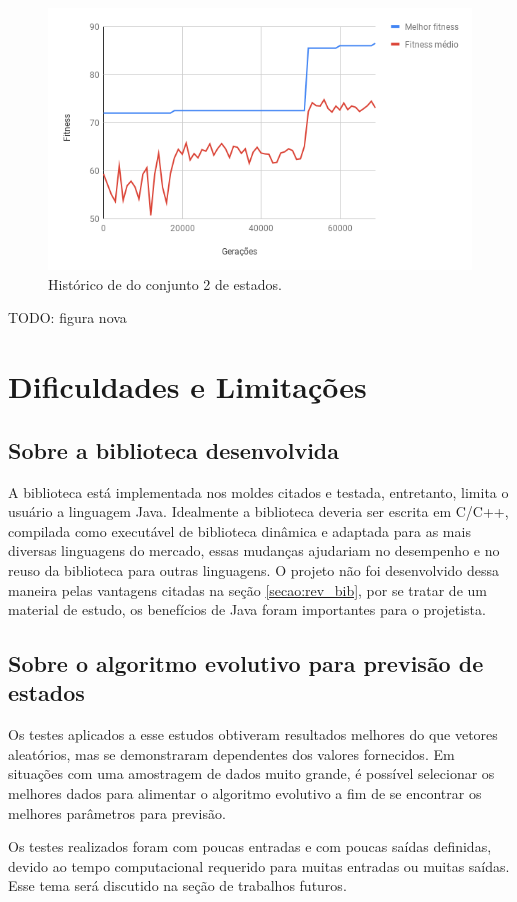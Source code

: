 \begin{figure}[htb]
    \caption{Histórico de \fitness do conjunto 2 de estados.}
    \label{figura:resultado_79}
    \centering
    \includegraphics[scale=0.8]{images/resultado_79}
    \fautor
\end{figure}

TODO: figura nova

\section{Dificuldades e Limitações}

\subsection{Sobre a biblioteca desenvolvida}

A biblioteca está implementada nos moldes citados e testada, entretanto, limita o usuário a linguagem Java. Idealmente a biblioteca deveria ser escrita em C/C++, compilada como executável de biblioteca dinâmica e adaptada para as mais diversas linguagens do mercado, essas mudanças ajudariam no desempenho e no reuso da biblioteca para outras linguagens. O projeto não foi desenvolvido dessa maneira pelas vantagens citadas na seção \ref{secao:rev_bib}, por se tratar de um material de estudo, os benefícios de Java foram importantes para o projetista.

\subsection{Sobre o algoritmo evolutivo para previsão de estados}

Os testes aplicados a esse estudos obtiveram resultados melhores do que vetores aleatórios, mas se demonstraram dependentes dos valores fornecidos. Em situações com uma amostragem de dados muito grande, é possível selecionar os melhores dados para alimentar o algoritmo evolutivo a fim de se encontrar os melhores parâmetros para previsão.

Os testes realizados foram com poucas entradas e com poucas saídas definidas, devido ao tempo computacional requerido para muitas entradas ou muitas saídas. Esse tema será discutido na seção de trabalhos futuros.

